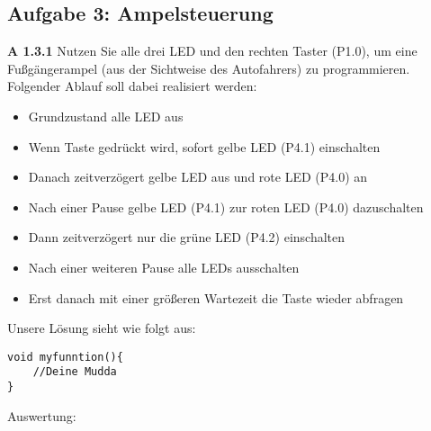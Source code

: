 \subsection*{Aufgabe 3: Ampelsteuerung}

\textbf{A 1.3.1} Nutzen Sie alle drei LED und den rechten Taster (P1.0), um eine Fußgängerampel (aus der Sichtweise des Autofahrers) zu programmieren. Folgender Ablauf soll dabei realisiert werden:

\begin{itemize}

\item Grundzustand alle LED aus
\item Wenn Taste gedrückt wird, sofort gelbe LED (P4.1) einschalten
\item Danach zeitverzögert gelbe LED aus und rote LED (P4.0) an
\item Nach einer Pause gelbe LED (P4.1) zur roten LED (P4.0) dazuschalten
\item Dann zeitverzögert nur die grüne LED (P4.2) einschalten
\item Nach einer weiteren Pause alle LEDs ausschalten
\item Erst danach mit einer größeren Wartezeit die Taste wieder abfragen

\end{itemize}

\vspace{\baselineskip}

Unsere Lösung sieht wie folgt aus:

\begin{lstlisting}
void myfunntion(){
	//Deine Mudda
}
\end{lstlisting}

Auswertung: